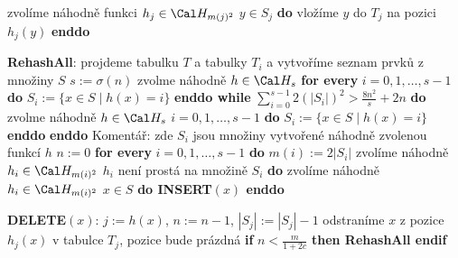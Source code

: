 \documentclass[a4paper,12pt]{article}
\begin{document}
\phantom{---------------}zvolíme náhodně funkci $
h_j\in \Cal H_{m(j)^2}$\newline 
\phantom{------------}{\bf enddo}\newline 
\phantom{------------}{\bf for every} $y\in S_j$ {\bf do} vložíme $
y$ do $T_j$ na pozici $h_j(y)$ {\bf enddo}\newline 
\phantom{---------}{\bf endif}\newline 
\phantom{------}{\bf endif}\newline 
\phantom{---}{\bf else}\newline 
\phantom{------}{\bf RehashAll}\newline 
\phantom{---}{\bf endif\newline 
endif}
\bigskip

{\bf RehashAll}:\newline 
projdeme tabulku $T$ a tabulky $T_i$ a vytvoříme seznam 
prvků z množiny $S$\newline 
$s:=\sigma(n)$\newline 
zvolme náhodně $h\in \Cal H_s$ \newline 
{\bf for every} $i=0,1,\dots,s-1$ {\bf do} $S_i:=\{x\in 
S\mid h(x)=i\}$ {\bf enddo\newline 
while} $\sum_{i=0}^{s-1}2(|S_i|)^2>\frac {8n^2}s+2n$ {\bf do}\newline 
\phantom{---}zvolme náhodně $h\in \Cal H_s$ \newline 
\phantom{---}{\bf for every} $i=0,1,\dots,s-1$ {\bf do} $
S_i:=\{x\in S\mid h(x)=i\}$ {\bf enddo}\newline 
{\bf enddo}\newline
Komentář: zde $S_i$ jsou množiny vytvořené náhodně zvolenou 
funkcí $h$ \newline 
$n:=0$ \newline 
{\bf for every} $i=0,1,\dots,s-1$ {\bf do}\newline 
\phantom{---}$m(i):=2|S_i|$\newline 
\phantom{---}zvolíme náhodně $h_i\in \Cal H_{m(i
)^2}$\newline 
\phantom{---}{\bf while} $h_i$ není prostá na množině $
S_i$ {\bf do}\newline 
\phantom{------}zvolíme náhodně $h_i\in \Cal H_{m(i)^2}$\newline 
\phantom{---}{\bf enddo\newline 
enddo\newline 
for every} $x\in S$ {\bf do INSERT$(x)$ enddo}
\bigskip

{\bf DELETE$(x)$}:\newline 
$j:=h(x)$, $n:=n-1$, $|S_j|:=|S_j|-1$\newline 
odstraníme $x$ z pozice $h_j(x)$ v tabulce $T_j$, pozice bude prázdná \newline 
{\bf if} $n<\frac m{1+2c}$ {\bf then RehashAll endif}
\bigskip
\end{document}
